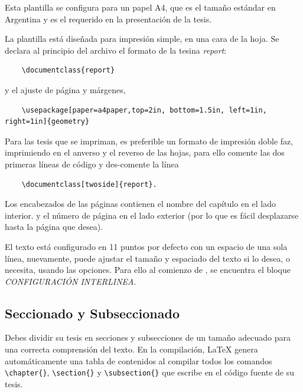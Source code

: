 Esta plantilla se configura para un papel A4, que es el tamaño estándar en Argentina y es el requerido en la presentación de la tesis. 
 
La plantilla está diseñada para impresión simple,  en una cara de la hoja. Se declara al principio del archivo  el formato de la tesina \emph{report}:
\begin{verbatim}
	\documentclass{report}
\end{verbatim}

y el ajuste de página y  márgenes, 
\begin{verbatim}
	\usepackage[paper=a4paper,top=2in, bottom=1.5in, left=1in, right=1in]{geometry}
\end{verbatim}

 Para las tesis que se impriman, es preferible un formato de impresión doble faz, imprimiendo en el anverso y el reverso de las hojas, para ello comente las dos primeras líneas de código y des-comente la línea 
\begin{verbatim}
	\documentclass[twoside]{report}.
\end{verbatim}


Los encabezados de las páginas contienen el nombre del capítulo en el lado interior. y el número de página en el lado exterior (por lo que es fácil desplazarse hasta la página que desea).

El texto está configurado en 11 puntos por defecto con un espacio de una sola línea, nuevamente, puede ajustar el tamaño y espaciado del texto si lo desea, o necesita, usando las opciones. Para ello al comienzo de , se encuentra el bloque \emph{CONFIGURACIÓN INTERLINEA}.


\subsection{Seccionado y Subseccionado}


Debes dividir su tesis en secciones y subsecciones de un tamaño adecuado para una correcta comprensión del texto. En la compilación, \LaTeX{} genera automáticamente una tabla de contenidos al compilar  todos los comandos \verb|\chapter{}|, \verb|\section{}| y \verb|\subsection{}| que escribe en el código fuente de su tesis.

